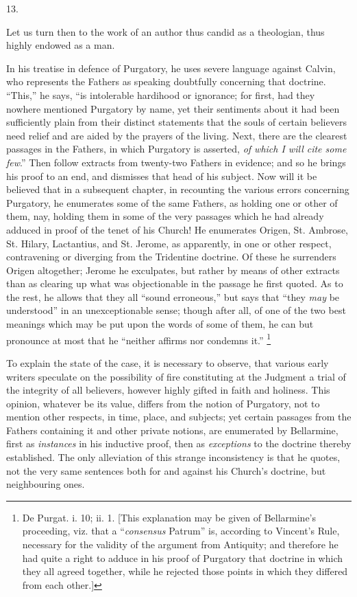 13.

Let us turn then to the work of an author thus candid as a
theologian, thus highly endowed as a man.

In his treatise in defence of Purgatory, he uses severe language
against Calvin, who represents the Fathers as speaking doubtfully
concerning that doctrine. ``This,'' he says, ``is
intolerable hardihood or ignorance; for first, had they nowhere
mentioned Purgatory by name, yet their sentiments about it had been
sufficiently plain from their distinct statements that the souls of
certain believers need relief and are aided by the prayers of the
living. Next, there are the clearest passages in the Fathers, in which
Purgatory is asserted, \emph{of which I will cite some few}.''
Then follow extracts from twenty-two Fathers in evidence; and so he
brings his proof to an end, and dismisses that head of his subject.
Now will it be believed that in a subsequent chapter, in recounting
the various errors concerning Purgatory, he enumerates some of the
same Fathers, as holding one or other of them, nay, holding them in
some of the very passages which he had already adduced in proof of the
tenet of his Church! He enumerates Origen, St. Ambrose, St. Hilary,
Lactantius, and St. Jerome, as apparently, in one or other respect,
contravening or diverging from the Tridentine doctrine. Of these he
surrenders Origen altogether; Jerome he exculpates, but rather by
means of other extracts than as clearing up what was objectionable in
the passage he first quoted. As to the rest, he allows that they all
``sound erroneous,'' but says that ``they \emph{may} be
understood'' in an unexceptionable sense; though after all, of one
of the two best meanings which may be put upon the words of some of
them, he can but pronounce at most that he ``neither affirms nor
condemns it.'' \footnote{De Purgat. i. 10; ii. 1. [This explanation
may be given of Bellarmine's proceeding, viz. that a ``\emph{consensus}
Patrum'' is, according to Vincent's Rule, necessary for the
validity of the argument from Antiquity; and therefore he had quite a
right to adduce in his proof of Purgatory that doctrine in which they
all agreed together, while he rejected those points in which they
differed from each other.]}

To explain the state of the case, it is necessary to observe, that
various early writers speculate on the possibility of fire
constituting at the Judgment a trial of the integrity of all
believers, however highly gifted in faith and holiness. This opinion,
whatever be its value, differs from the notion of Purgatory, not to
mention other respects, in time, place, and subjects; yet certain
passages from the Fathers containing it and other private notions, are
enumerated by Bellarmine, first as \emph{instances} in his inductive
proof, then as \emph{exceptions} to the doctrine thereby established.
The only alleviation of this strange inconsistency is that he quotes,
not the very same sentences both for and against his Church's
doctrine, but neighbouring ones.

